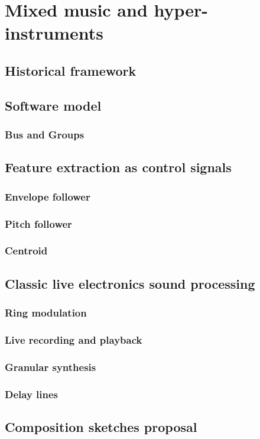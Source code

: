 \chapter{Mixed music and hyper-instruments}\label{mixed-music-and-hyper-instruments}

\section{Historical framework}\label{historical-framework}

\section{Software model}\label{software-model}
\subsection{Bus and Groups}\label{bus-and-groups}

\section{Feature extraction as control signals}\label{feature-extraction-as-control-signals}
\subsection{Envelope follower}\label{envelope-follower}
\subsection{Pitch follower}\label{pitch-follower}
\subsection{Centroid}\label{centroid}

\section{Classic live electronics sound processing}\label{classic-live-electronics-sound-processing}
\subsection{Ring modulation}\label{ring-modulation}
\subsection{Live recording and playback}\label{live-recording-and-playback}
\subsection{Granular synthesis}\label{granular-synthesis}
\subsection{Delay lines}\label{delay-lines}

\section{Composition sketches proposal}\label{composition-sketches-proposal}
